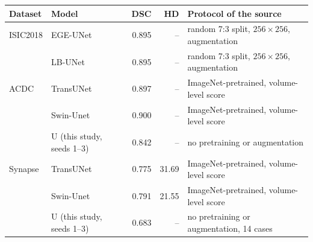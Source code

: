 \begin{tabular}{@{}llrrl@{}}
\toprule
Dataset & Model & DSC & HD\tnote{a} & Protocol of the source \\
\midrule
ISIC2018 & EGE-UNet \citep{Ruan2023EGEUNet} & 0.895 & -- & random 7:3 split, $256\times256$, augmentation \\
 & LB-UNet \citep{Xu2024LBUNet} & 0.895 & -- & random 7:3 split, $256\times256$, augmentation \\
ACDC & TransUNet \citep{Chen2021TransUNetArxiv} & 0.897 & -- & ImageNet-pretrained, volume-level score \\
 & Swin-Unet \citep{Cao2022SwinUnet} & 0.900 & -- & ImageNet-pretrained, volume-level score \\
 & U (this study, seeds 1--3)\tnote{b} & 0.842 & -- & no pretraining or augmentation \\
\addlinespace
Synapse & TransUNet \citep{Chen2021TransUNetArxiv} & 0.775 & 31.69 & ImageNet-pretrained, volume-level score \\
 & Swin-Unet \citep{Cao2022SwinUnet} & 0.791 & 21.55 & ImageNet-pretrained, volume-level score \\
 & U (this study, seeds 1--3)\tnote{b} & 0.683 & -- & no pretraining or augmentation, 14 cases \\
\bottomrule
\end{tabular}
